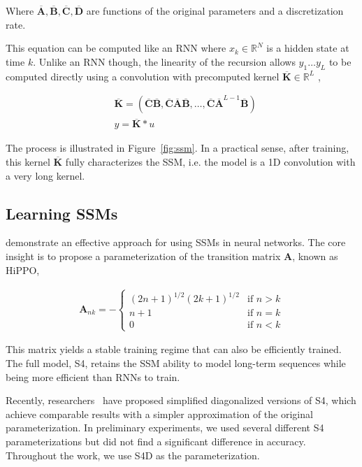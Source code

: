 Where $\boldsymbol{\overline{A}},\boldsymbol{\overline{B}},\boldsymbol{\overline{C}},\boldsymbol{\overline{D}}$ are functions of the original parameters and a discretization rate.

This equation can be computed like an RNN where $x_{k} \in \mathbb{R}^{N}$ is a hidden state at time $k$. Unlike an RNN though, the linearity of the recursion allows $y_1 \ldots y_L$ to be computed directly using a convolution with precomputed kernel $\boldsymbol{\overline{K}} \in \mathbb{R}^{L}$ ,

\begin{align*}
& \boldsymbol{\overline{K}} = (\boldsymbol{\overline{C}}\boldsymbol{\overline{B}}, \boldsymbol{\overline{C}}\boldsymbol{\overline{A}}\boldsymbol{\overline{B}}, \dots, \boldsymbol{\overline{C}}\boldsymbol{\overline{A}}^{L-1}\boldsymbol{\overline{B}}) \\
&y = \boldsymbol{\overline{K}} \ast u
\end{align*}

 The process is illustrated in Figure~\ref{fig:ssm}. In a practical sense, after training, this kernel $\boldsymbol{\overline{K}}$ fully characterizes the SSM, i.e. the model is a 1D convolution with a very long kernel.

\subsection{Learning SSMs}

\citet{gu2020hippo, gu2021efficiently} demonstrate an effective approach for using SSMs in neural networks. The core insight is to propose a parameterization of the transition matrix $\boldsymbol{A}$, known as HiPPO,

\begin{align*}  
\boldsymbol{A}_{nk}= -
\begin{cases} 
(2n+1)^{1/2}(2k+1)^{1/2} & \text{if } n > k \\ n+1 &\text{if } n=k \\ 0 & \text{if } n < k 
\end{cases} 
\end{align*}

This matrix yields a stable training regime that can also be efficiently trained. The full model, S4, retains the SSM ability to model long-term sequences while being more efficient than RNNs to train. 

Recently, researchers~\cite{gu2022parameterization, gupta2022diagonal} have proposed simplified diagonalized versions of S4, which achieve comparable results with a simpler approximation of the original parameterization. In preliminary experiments, we used several different S4 parameterizations but did not find a significant difference in accuracy. Throughout the work, we use S4D as the parameterization.

